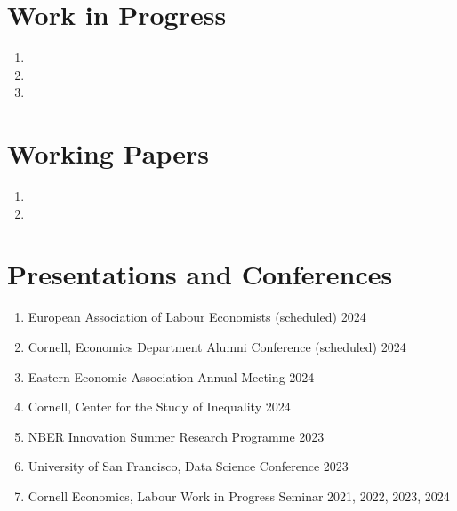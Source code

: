 \documentclass[letterpaper,11pt,oneside]{article}
\begin{document}
\section*{Work in Progress}
\begin{enumerate}[itemsep=2.5pt, label={}]
    \item {}
    \item {}
    \item {}
\end{enumerate}


\section*{Working Papers}
\begin{enumerate}[itemsep=2.5pt, label={}]
    \item {}
    \item {}
\end{enumerate}


\section*{Presentations and Conferences}
\begin{enumerate}[itemsep=2pt, label={}]
    \item European Association of Labour Economists \hfill (scheduled) 2024
    \item Cornell, Economics Department Alumni Conference \hfill (scheduled) 2024
    \item Eastern Economic Association Annual Meeting \hfill 2024
    \item Cornell, Center for the Study of Inequality \hfill 2024
    \item NBER Innovation Summer Research Programme \hfill 2023
    \item University of San Francisco, Data Science Conference \hfill 2023
    \item Cornell Economics, Labour Work in Progress Seminar \hfill 2021, 2022, 2023, 2024
\end{enumerate}
\end{document}
